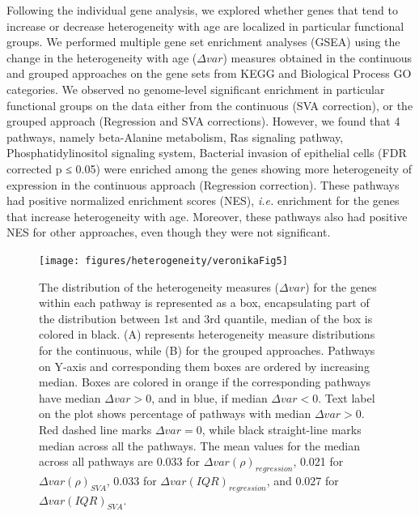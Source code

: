 \documentclass[12pt,twoside]{unicam}
\begin{document}
Following the individual gene analysis, we explored whether genes that tend to increase or decrease heterogeneity with age are localized in particular functional groups. We performed multiple gene set enrichment analyses (GSEA) using the change in the heterogeneity with age (\(\Delta var\)) measures obtained in the continuous and grouped approaches on the gene sets from KEGG and Biological Process GO categories. We observed no genome-level significant enrichment in particular functional groups on the data either from the continuous (SVA correction), or the grouped approach (Regression and SVA corrections). However, we found that 4 pathways, namely beta-Alanine metabolism, Ras signaling pathway, Phosphatidylinositol signaling system, Bacterial invasion of epithelial cells (FDR corrected p ≤ 0.05) were enriched among the genes showing more heterogeneity of expression in the continuous approach (Regression correction). These pathways had positive normalized enrichment scores (NES), \emph{i.e.} enrichment for the genes that increase heterogeneity with age. Moreover, these pathways also had positive NES for other approaches, even though they were not significant.

\begin{figure}

{\centering \texttt{[image: figures/heterogeneity/veronikaFig5]} 

}

\caption[Distributions of the heterogeneity measures obtained using a combination of continuous and grouped approaches with regression and SVA-correction for the individual pathways in KEGG database.]{The distribution of the heterogeneity measures ($\Delta var$) for the genes within each pathway is represented as a box, encapsulating part of the distribution between 1st and 3rd quantile, median of the box is colored in black. (A) represents heterogeneity measure distributions for the continuous, while (B) for the grouped approaches. Pathways on Y-axis and corresponding them boxes are ordered by increasing median. Boxes are colored in orange if the corresponding pathways have median $\Delta var > 0$, and in blue, if median $\Delta var < 0$. Text label on the plot shows percentage of pathways with median $\Delta var > 0$. Red dashed line marks $\Delta var = 0$, while black straight-line marks median across all the pathways. The mean values for the median across all pathways are 0.033 for $\Delta var(\rho)_{regression}$, 0.021 for $\Delta var(\rho)_{SVA}$, 0.033 for $\Delta var(IQR)_{regression}$, and 0.027 for $\Delta var(IQR)_{SVA}$.}\label{fig:veronikaFig5}
\end{figure}
\end{document}
